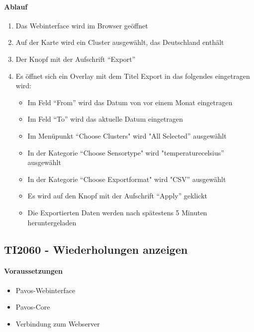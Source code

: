 \paragraph{Ablauf}
\begin{enumerate}
\item Das Webinterface wird im Browser geöffnet
\item Auf der Karte wird ein Cluster ausgewählt, das Deutschland enthält
\item Der Knopf mit der Aufschrift ``Export''
\item Es öffnet sich ein Overlay mit dem Titel Export in das folgendes eingetragen wird:
\begin{itemize}
\item Im Feld ``From'' wird das Datum von vor einem Monat eingetragen
\item Im Feld ``To'' wird das aktuelle Datum eingetragen
\item Im Menüpunkt  ``Choose Clusters" wird "All Selected'' ausgewählt
\item In der Kategorie ``Choose Sensortype" wird "temperature\textunderscore celsius'' ausgewählt
\item In der Kategorie ``Choose Exportformat" wird "CSV'' ausgewählt
\item Es wird auf den Knopf mit der Aufschrift ``Apply'' geklickt
\item Die Exportierten Daten werden nach spätestens 5 Minuten heruntergeladen
\end{itemize}
\end{enumerate}
\szenarioGood

\subsection{TI2060 - Wiederholungen anzeigen}
\paragraph{Voraussetzungen}
\begin{itemize}
\item Pavos-Webinterface
\item Pavos-Core
\item Verbindung zum Webserver
\end{itemize}
